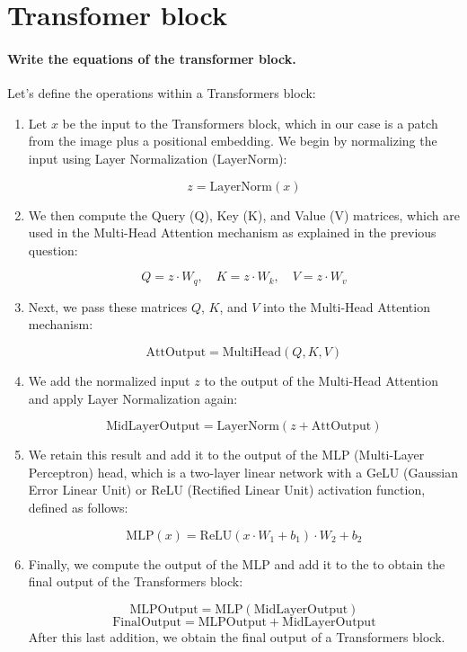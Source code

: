 \section{Transfomer block}

\paragraph{Write the equations of the transformer block.}
Let's define the operations within a Transformers block:

\begin{enumerate}
    \item Let \( x \) be the input to the Transformers block, which in our case is a patch from the image plus a positional embedding. We begin by normalizing the input using Layer Normalization (LayerNorm):

          \[
              z = \text{LayerNorm}(x)
          \]

    \item We then compute the Query (Q), Key (K), and Value (V) matrices, which are used in the Multi-Head Attention mechanism as explained in the previous question:

          \[
              Q = z \cdot W_q, \quad K = z \cdot W_k, \quad V = z \cdot W_v
          \]

    \item Next, we pass these matrices \( Q \), \( K \), and \( V \) into the Multi-Head Attention mechanism:

          \[
              \text{AttOutput} = \text{MultiHead}(Q, K, V)
          \]

    \item We add the normalized input \( z \) to the output of the Multi-Head Attention and apply Layer Normalization again:

          \[
              \text{MidLayerOutput} = \text{LayerNorm}(z + \text{AttOutput})
          \]

    \item We retain this result and add it to the output of the MLP (Multi-Layer Perceptron) head, which is a two-layer linear network with a GeLU (Gaussian Error Linear Unit) or ReLU (Rectified Linear Unit) activation function, defined as follows:

          \[
              \text{MLP}(x) = \text{ReLU}(x \cdot W_1 + b_1) \cdot W_2 + b_2
          \]

    \item Finally, we compute the output of the MLP and add it to the  to obtain the final output of the Transformers block:

          \[
              \text{MLPOutput} = \text{MLP}(\text{MidLayerOutput})
          \]
          \[
              \text{FinalOutput} = \text{MLPOutput} + \text{MidLayerOutput}
          \]
          After this last addition, we obtain the final output of a Transformers block.
\end{enumerate}

